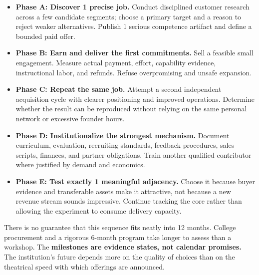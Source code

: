 \begin{itemize}
    \item \textbf{Phase A: Discover 1 precise job.} Conduct disciplined customer research across a few candidate segments; choose a primary target and a reason to reject weaker alternatives. Publish 1 serious competence artifact and define a bounded paid offer.
    \item \textbf{Phase B: Earn and deliver the first commitments.} Sell a feasible small engagement. Measure actual payment, effort, capability evidence, instructional labor, and refunds. Refuse overpromising and unsafe expansion.
    \item \textbf{Phase C: Repeat the same job.} Attempt a second independent acquisition cycle with clearer positioning and improved operations. Determine whether the result can be reproduced without relying on the same personal network or excessive founder hours.
    \item \textbf{Phase D: Institutionalize the strongest mechanism.} Document curriculum, evaluation, recruiting standards, feedback procedures, sales scripts, finances, and partner obligations. Train another qualified contributor where justified by demand and economics.
    \item \textbf{Phase E: Test exactly 1 meaningful adjacency.} Choose it because buyer evidence and transferable assets make it attractive, not because a new revenue stream sounds impressive. Continue tracking the core rather than allowing the experiment to consume delivery capacity.
\end{itemize}

There is no guarantee that this sequence fits neatly into 12 months. College procurement and a rigorous 6-month program take longer to assess than a workshop. The \textbf{milestones are evidence states, not calendar promises.} The institution's future depends more on the quality of choices than on the theatrical speed with which offerings are announced.
